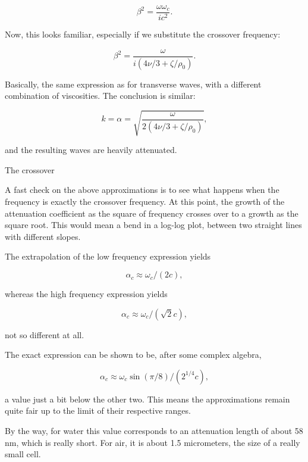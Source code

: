 \[ \beta^2 = \frac{\omega\omega_c}{i c^2} .\]

Now, this looks familiar, especially if we substitute the crossover
frequency:

\[ \beta^2 = \frac{\omega}{i(4\nu/3+\zeta/\rho_0)} .\]

Basically, the same expression as for transverse waves, with a
different combination of viscosities. The conclusion is similar:

\[ k=\alpha =\sqrt{ \frac{\omega}{ 2(4\nu/3+\zeta/\rho_0)}},\]

and the resulting waves are heavily attenuated.



The crossover

A fast check on the above approximations is to see what happens when
the frequency is exactly the crossover frequency. At this point, the
growth of the attenuation coefficient as the square of frequency
crosses over to a growth as the square root. This would mean a bend in
a log-log plot, between two straight lines with different slopes.

The extrapolation of the low frequency expression yields

\[ \alpha_c\approx \omega_c/(2 c) , \]

whereas the high frequency expression yields

\[ \alpha_c\approx \omega_c/(\sqrt{2} c) , \]

not so different at all.

The exact expression can be shown to be, after some complex algebra,

\[ \alpha_c\approx \omega_c \sin(\pi/8) / (2^{1/4} c) , \]

a value just a bit below the other two. This means the approximations
remain quite fair up to the limit of their respective ranges.

By the way, for water this value corresponds to an attenuation length
of about 58 nm, which is really short. For air, it is about 1.5
micrometers, the size of a really small cell.



 
